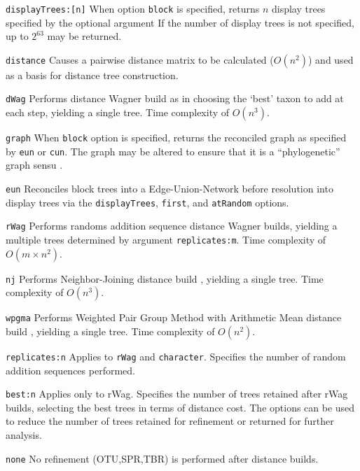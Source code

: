 \documentclass[11pt]{article}
\begin{document}
		\smallskip
		\noindent \texttt{displayTrees:[n]} When option \texttt{block} is specified, returns $n$ display trees specified by the optional argument  If the number of display trees is not specified, up to  $2^{63}$ may be returned.
	
		\smallskip
		\noindent \texttt{distance} Causes a pairwise distance matrix to be calculated ($O(n^2)$) and used as a basis for distance tree construction.
		
		\smallskip
		\noindent \texttt{dWag} Performs distance Wagner build as in \citep{Farris1972} choosing the `best' taxon to add at each step, 
		yielding a single tree.  Time complexity of $O(n^3)$.
		
		\noindent \texttt{graph} When \texttt{block} option  is specified, returns the reconciled graph as specified by \texttt{eun} or \texttt{cun}.  The graph may be altered to
		ensure that it is a ``phylogenetic'' graph sensu \cite{Moretetal2005}.
		
		\smallskip
		\smallskip
		\noindent \texttt{eun} Reconciles block trees into a  Edge-Union-Network \citep{MiyagiandWheeler2019, Wheeler2022} before resolution into display trees via the \texttt{displayTrees}, \texttt{first},
		and \texttt{atRandom} options.
		
		\smallskip
		\noindent \texttt{rWag} Performs randoms addition sequence distance Wagner builds, yielding a multiple trees determined 
		by argument \texttt{replicates:m}.  Time complexity of $O(m \times n^2)$.
		
		\smallskip		
		\noindent \texttt{nj} Performs Neighbor-Joining distance build \citep{Saitou1987}, yielding a single tree.  Time complexity of $O(n^3)$.
		
		\smallskip		
		\noindent \texttt{wpgma} Performs Weighted Pair Group Method with Arithmetic Mean distance build \citep{SokalandMichener1958}, 
		yielding a single tree.  Time complexity of $O(n^2)$.
		
		\smallskip		
		\noindent \texttt{replicates:n}  Applies to \texttt{rWag} and \texttt{character}.  Specifies the number of random addition sequences performed. 
		
		\smallskip		
		\noindent \texttt{best:n} Applies only to rWag.  Specifies the number of trees retained after rWag builds, selecting 
		the best trees in terms of distance cost.  The options can be used to reduce
		the number of trees retained for refinement or returned for further analysis.  
		
		\smallskip		
		\noindent \texttt{none} No refinement (OTU,SPR,TBR) is performed after distance builds.
		
\end{document}
